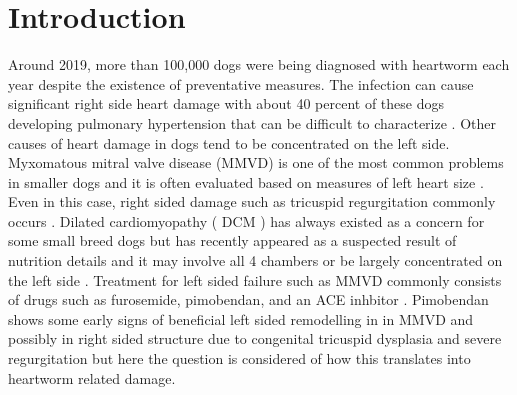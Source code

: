 \maketitle
\tableofcontents
\newpage


\section{Introduction}

Around 2019,  more than  100,000 dogs were being
diagnosed with heartworm each year 
\cite{Self_Pulaski_McMahan_Regional_local_temporal_2019}
despite the existence of preventative measures.
The infection can cause significant right side heart  damage with 
about 40 percent of these dogs developing  pulmonary hypertension
that can  be difficult to characterize
\cite{Matos_DiazRocio_GarciaRodriguez_Diagnostic_Value_2026}.
Other causes of heart damage in dogs tend to be concentrated
on the left side. 
Myxomatous mitral valve disease (MMVD) is one of the most common
problems in smaller dogs and it is often evaluated based on 
measures of left heart size \cite{MIKAWA202092}.
Even in this case, right sided damage such as tricuspid regurgitation
\cite{wRtbEQAAQBAJ}
 commonly occurs
\cite{Borgarelli_Abbott_BrazRuivo_Prevalence_Prognostic_Importance_2015}.
Dilated cardiomyopathy ( DCM ) has always existed as a concern
for some small breed dogs but has recently appeared as
a suspected result of  nutrition details  and it may involve
all 4 chambers or be largely concentrated on the left side
\cite{McCauley_Clark_Quest_Review_canine_dilated_}.
Treatment for left sided failure such
as MMVD 
commonly consists of drugs such as furosemide,
pimobendan, and an ACE inhbitor
\cite{Saetang_Surachetpong_Short_term_effects_2020}
. 
Pimobendan shows some early signs of beneficial left sided  remodelling in
 in MMVD 
\cite{PMC13529528} 
and possibly in right sided structure due to congenital tricuspid
dysplasia and severe regurgitation
\cite{PMC13794051}
but here the question is considered of how this
translates into heartworm related damage. 


